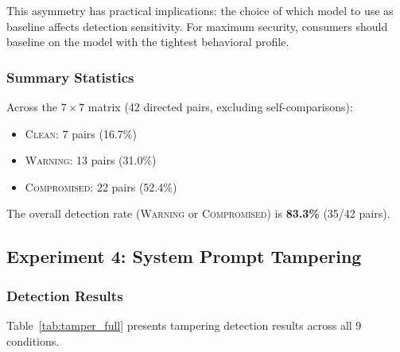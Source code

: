 \documentclass[11pt,twocolumn]{article}
\begin{document}
This asymmetry has practical implications: the choice of which model to use as baseline affects detection sensitivity.
For maximum security, consumers should baseline on the model with the tightest behavioral profile.

\subsubsection{Summary Statistics}

Across the $7 \times 7$ matrix (42 directed pairs, excluding self-comparisons):
\begin{itemize}[nosep]
    \item \textsc{Clean}: 7 pairs (16.7\%)
    \item \textsc{Warning}: 13 pairs (31.0\%)
    \item \textsc{Compromised}: 22 pairs (52.4\%)
\end{itemize}

The overall detection rate (\textsc{Warning} or \textsc{Compromised}) is \textbf{83.3\%} (35/42 pairs).

\subsection{Experiment 4: System Prompt Tampering}
\label{sec:exp4}

\subsubsection{Detection Results}

Table~\ref{tab:tamper_full} presents tampering detection results across all 9 conditions.
\end{document}

